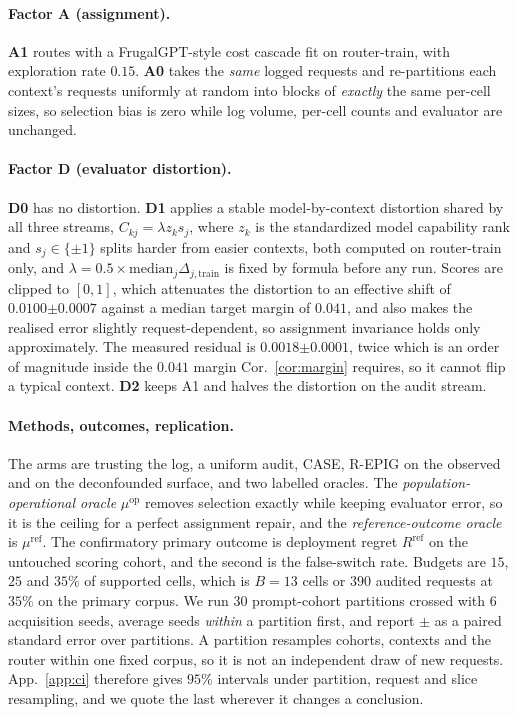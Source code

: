 \documentclass{article}
\theoremstyle{plain}
\theoremstyle{remark}
\newcommand{\muref}{\mu^{\mathrm{ref}}}
\newcommand{\muop}{\mu^{\mathrm{op}}}
\newcommand{\Rref}{R^{\mathrm{ref}}}
\newcommand{\se}[1]{{\scriptstyle\pm#1}}
\begin{document}
\paragraph{Factor A (assignment).} \textbf{A1} routes with a FrugalGPT-style cost cascade
\citep{chen2023frugalgpt} fit on router-train, with exploration rate $0.15$. \textbf{A0} takes the
\emph{same} logged requests and re-partitions each context's requests uniformly at random into blocks
of \emph{exactly} the same per-cell sizes, so selection bias is zero while log volume, per-cell counts
and evaluator are unchanged.

\paragraph{Factor D (evaluator distortion).} \textbf{D0} has no distortion. \textbf{D1} applies a
stable model-by-context distortion shared by all three streams, $C_{kj}=\lambda z_k s_j$, where $z_k$
is the standardized model capability rank and $s_j\in\{\pm1\}$ splits harder from easier contexts,
both computed on router-train only, and $\lambda=0.5\times\mathrm{median}_j\Delta_{j,\mathrm{train}}$
is fixed by formula before any run. Scores are clipped to $[0,1]$, which attenuates the distortion to
an effective shift of $0.0100\se{0.0007}$ against a median target margin of $0.041$, and also makes
the realised error slightly request-dependent, so assignment invariance holds only approximately. The
measured residual is $0.0018\se{0.0001}$, twice which is an order of magnitude inside the $0.041$
margin Cor.~\ref{cor:margin} requires, so it cannot flip a typical context. \textbf{D2} keeps A1 and
halves the distortion on the audit stream.

\paragraph{Methods, outcomes, replication.} The arms are trusting the log, a uniform audit, CASE,
R-EPIG on the observed and on the deconfounded surface, and two labelled oracles. The
\emph{population-operational oracle} $\muop$ removes selection exactly while keeping evaluator error,
so it is the ceiling for a perfect assignment repair, and the \emph{reference-outcome oracle} is
$\muref$. The confirmatory primary outcome is deployment regret $\Rref$ on the untouched scoring
cohort, and the second is the false-switch rate. Budgets are $15$, $25$ and $35\%$ of supported
cells, which is $B{=}13$ cells or $390$ audited requests at $35\%$ on the primary corpus. We run $30$
prompt-cohort partitions crossed with $6$ acquisition seeds, average seeds \emph{within} a partition
first, and report $\pm$ as a paired standard error over partitions. A partition resamples cohorts,
contexts and the router within one fixed corpus, so it is not an independent draw of new requests.
App.~\ref{app:ci} therefore gives $95\%$ intervals under partition, request and slice resampling, and
we quote the last wherever it changes a conclusion.
\end{document}

